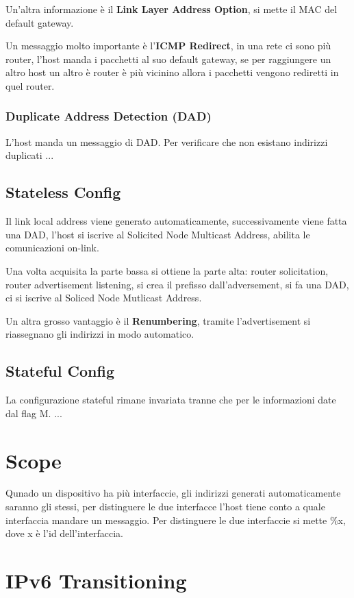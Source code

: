 \documentclass[12pt]{article}
\begin{document}
Un'altra informazione \`e il \textbf{Link Layer Address Option}, si mette il MAC del default gateway.

Un messaggio molto importante \`e l'\textbf{ICMP Redirect}, in una rete ci sono pi\`u router, l'host manda i pacchetti al suo default gateway, se per raggiungere un altro host un altro \`e router \`e pi\`u vicinino allora i pacchetti vengono rediretti in quel router.

\subsubsection{Duplicate Address Detection (DAD)}
L'host manda un messaggio di DAD. 
Per verificare che non esistano indirizzi duplicati ...


\subsection{Stateless Config}
Il link local address viene generato automaticamente, successivamente viene fatta una DAD, l'host si iscrive al Solicited Node Multicast Address, abilita le comunicazioni on-link.

Una volta acquisita la parte bassa si ottiene la parte alta: router solicitation, router advertisement listening, si crea il prefisso dall'adversement, si fa una DAD, ci si iscrive al Soliced Node Mutlicast Address.

Un altra grosso vantaggio \`e il \textbf{Renumbering}, tramite l'advertisement si riassegnano gli indirizzi in modo automatico.

\subsection{Stateful Config}
La configurazione stateful rimane invariata tranne che per le informazioni date dal flag M.
...


\section{Scope}
Qunado un dispositivo ha pi\`u interfaccie, gli indirizzi generati automaticamente saranno gli stessi, per distinguere le due interfacce l'host tiene conto a quale interfaccia mandare un messaggio. Per distinguere le due interfaccie si mette \%x, dove x \`e l'id dell'interfaccia.



\section{IPv6 Transitioning}
\end{document}
